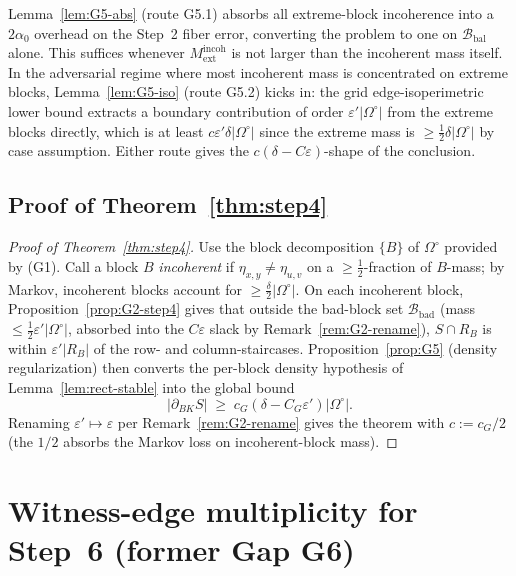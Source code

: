 \begin{remark}\label{rem:G5-routes}
Lemma~\ref{lem:G5-abs} (route G5.1) absorbs all extreme-block
incoherence into a $2\alpha_0$ overhead on the Step~2 fiber error,
converting the problem to one on $\mathcal B_{\mathrm{bal}}$ alone. This
suffices whenever $M_{\mathrm{ext}}^{\mathrm{incoh}}$ is not larger than
the incoherent mass itself. In the adversarial regime where most
incoherent mass is concentrated on extreme blocks,
Lemma~\ref{lem:G5-iso} (route G5.2) kicks in: the grid edge-isoperimetric
lower bound extracts a boundary contribution of order
$\varepsilon'|\Omega^\circ|$ from the extreme blocks directly, which is
at least $c\varepsilon'\delta|\Omega^\circ|$ since the extreme mass is
$\ge\tfrac12\delta|\Omega^\circ|$ by case assumption. Either route gives
the $c(\delta-C\varepsilon)$-shape of the conclusion.
\end{remark}

\subsection{Proof of Theorem~\ref{thm:step4}}

\begin{proof}[Proof of Theorem~\ref{thm:step4}]
Use the block decomposition $\{B\}$ of $\Omega^\circ$ provided by
(G1). Call a block $B$ \emph{incoherent} if $\eta_{x,y}\ne\eta_{u,v}$ on
a $\ge\tfrac12$-fraction of $B$-mass; by Markov, incoherent blocks
account for $\ge\tfrac\delta2|\Omega^\circ|$. On each incoherent block,
Proposition~\ref{prop:G2-step4} gives that outside the bad-block set
$\mathcal B_{\mathrm{bad}}$ (mass $\le\tfrac12\varepsilon'|\Omega^\circ|$,
absorbed into the $C\varepsilon$ slack by Remark~\ref{rem:G2-rename}),
$S\cap R_B$ is within $\varepsilon'|R_B|$ of the row- and
column-staircases. Proposition~\ref{prop:G5} (density regularization)
then converts the per-block density hypothesis of
Lemma~\ref{lem:rect-stable} into the global bound
\[
|\partial_{BK}S|\;\ge\;c_G(\delta-C_G\varepsilon')|\Omega^\circ|.
\]
Renaming $\varepsilon'\mapsto\varepsilon$ per Remark~\ref{rem:G2-rename}
gives the theorem with $c:=c_G/2$ (the $1/2$ absorbs the Markov loss on
incoherent-block mass).
\end{proof}

\section{Witness-edge multiplicity for Step~6 (former Gap G6)}
\label{sec:witness-mult}

